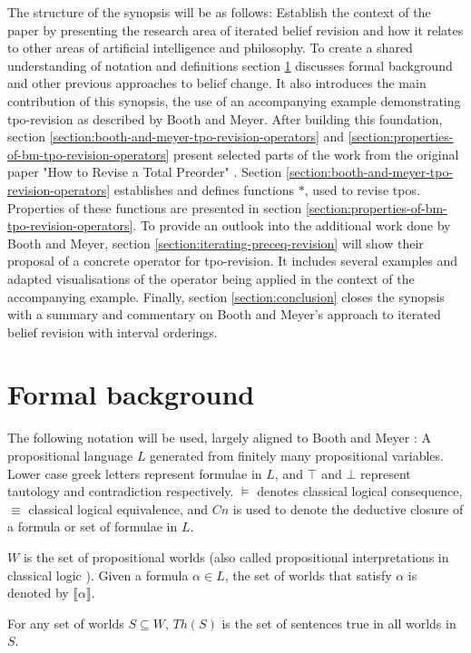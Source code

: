 \documentclass[english, 12pt]{scrartcl}
\theoremstyle{definition}
\theoremstyle{definition}
\theoremstyle{definition}
\newcommand{\modelsOf}[1]{\llbracket #1 \rrbracket}
\begin{document}
The structure of the synopsis will be as follows: Establish the context of the paper by presenting the research area of iterated belief revision and how it relates to other areas of artificial intelligence and philosophy. To create a shared understanding of notation and definitions section \ref{section:formal-background} discusses formal background and other previous approaches to belief change. It also introduces the main contribution of this synopsis, the use of an accompanying example demonstrating tpo-revision as described by Booth and Meyer. After building this foundation, section \ref{section:booth-and-meyer-tpo-revision-operators} and \ref{section:properties-of-bm-tpo-revision-operators} present selected parts of the work from the original paper "How to Revise a Total Preorder" \cite{Booth2011}. Section \ref{section:booth-and-meyer-tpo-revision-operators} establishes and defines functions $\ast$, used to revise tpos. Properties of these functions are presented in section \ref{section:properties-of-bm-tpo-revision-operators}. To provide an outlook into the additional work done by Booth and Meyer, section \ref{section:iterating-preceq-revision} will show their proposal of a concrete operator for tpo-revision. It includes several examples and adapted visualisations of the operator being applied in the context of the accompanying example. Finally, section \ref{section:conclusion} closes the synopsis with a summary and commentary on Booth and Meyer's approach to iterated belief revision with interval orderings.

\section{Formal background}
\label{section:formal-background}
The following notation will be used, largely aligned to Booth and Meyer \cite{Booth2011}: A propositional language $L$ generated from finitely many propositional variables. Lower case greek letters represent formulae in $L$, and $\top$ and $\bot$ represent tautology and contradiction respectively. $\models$ denotes classical logical consequence, $\equiv$ classical logical equivalence, and $Cn$ is used to denote the deductive closure of a formula or set of formulae in $L$.

$W$ is the set of propositional worlds (also called propositional interpretations in classical logic \cite{Kai2020}). Given a formula $\alpha \in L$, the set of worlds that satisfy $\alpha$ is denoted by $\modelsOf{\alpha}$.

For any set of worlds $S \subseteq W$, $Th(S)$ is the set of sentences true in all worlds in $S$.
\end{document}

